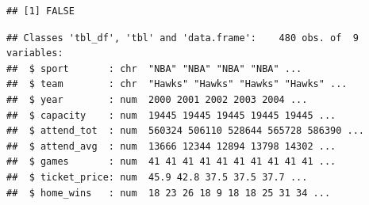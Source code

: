 \documentclass[man]{apa6}
\newenvironment{Shaded}{\begin{snugshade}}{\end{snugshade}}
\newcommand{\DataTypeTok}[1]{\textcolor[rgb]{0.13,0.29,0.53}{#1}}
\newcommand{\KeywordTok}[1]{\textcolor[rgb]{0.13,0.29,0.53}{\textbf{#1}}}
\newcommand{\NormalTok}[1]{#1}
\newcommand{\OperatorTok}[1]{\textcolor[rgb]{0.81,0.36,0.00}{\textbf{#1}}}
\newcommand{\StringTok}[1]{\textcolor[rgb]{0.31,0.60,0.02}{#1}}
\begin{document}
\begin{Shaded}
\end{Shaded}

\begin{verbatim}
## [1] FALSE
\end{verbatim}

\begin{Shaded}
\end{Shaded}

\begin{verbatim}
## Classes 'tbl_df', 'tbl' and 'data.frame':    480 obs. of  9 variables:
##  $ sport       : chr  "NBA" "NBA" "NBA" "NBA" ...
##  $ team        : chr  "Hawks" "Hawks" "Hawks" "Hawks" ...
##  $ year        : num  2000 2001 2002 2003 2004 ...
##  $ capacity    : num  19445 19445 19445 19445 19445 ...
##  $ attend_tot  : num  560324 506110 528644 565728 586390 ...
##  $ attend_avg  : num  13666 12344 12894 13798 14302 ...
##  $ games       : num  41 41 41 41 41 41 41 41 41 41 ...
##  $ ticket_price: num  45.9 42.8 37.5 37.5 37.7 ...
##  $ home_wins   : num  18 23 26 18 9 18 18 25 31 34 ...
\end{verbatim}
\end{document}
